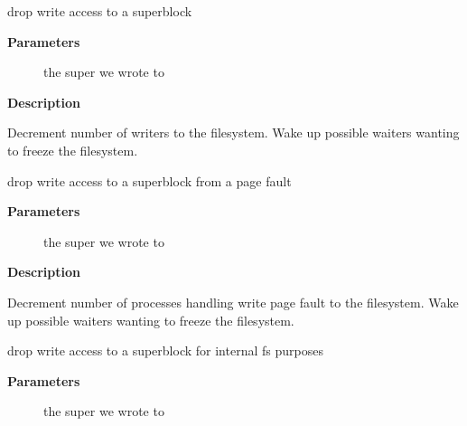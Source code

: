\documentclass[a4paper,8pt,english]{sphinxmanual}
\begin{document}
\begin{fulllineitems}
\label{filesystems/index:c.sb_end_write}
drop write access to a superblock

\end{fulllineitems}


\textbf{Parameters}
\begin{description}
\item[{}] \leavevmode
the super we wrote to

\end{description}

\textbf{Description}

Decrement number of writers to the filesystem. Wake up possible waiters
wanting to freeze the filesystem.

\begin{fulllineitems}
\label{filesystems/index:c.sb_end_pagefault}
drop write access to a superblock from a page fault

\end{fulllineitems}


\textbf{Parameters}
\begin{description}
\item[{}] \leavevmode
the super we wrote to

\end{description}

\textbf{Description}

Decrement number of processes handling write page fault to the filesystem.
Wake up possible waiters wanting to freeze the filesystem.

\begin{fulllineitems}
\label{filesystems/index:c.sb_end_intwrite}
drop write access to a superblock for internal fs purposes

\end{fulllineitems}


\textbf{Parameters}
\begin{description}
\item[{}] \leavevmode
the super we wrote to

\end{description}
\end{document}
